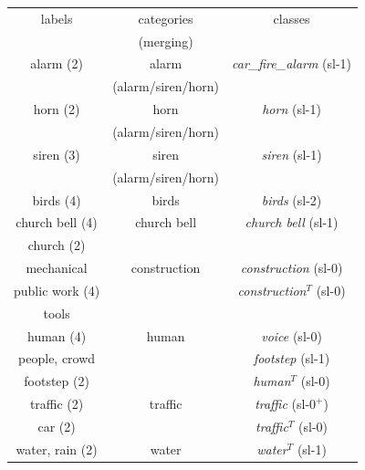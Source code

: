 \begin{table}[t]
\centering
\begin{tabular}{ccc}
labels                & categories         & classes\\
                      & (merging)          &        \\
\hline
alarm (2)             & alarm              &  \textit{car\_fire\_alarm} (sl-1) \\
                      & (alarm/siren/horn) &                                   \\
horn  (2)             & horn               &  \textit{horn} (sl-1)             \\
                      & (alarm/siren/horn) &                                    \\
siren (3)             & siren              &  \textit{siren} (sl-1)            \\
                      & (alarm/siren/horn) &                                    \\
birds (4)             & birds              &  \textit{birds} (sl-2)             \\
\hline
church bell (4)       & church bell        &  \textit{church bell} (sl-1)      \\
church (2)            &                    &                                   \\
\hline
mechanical            & construction       &  \textit{construction} (sl-0)       \\
public work  (4)      &                    &  \textit{construction}$^T$  (sl-0)    \\
tools                 &                    &                                  \\
\hline			                                                             
human (4)             & human              &   \textit{voice} (sl-0)           \\      
people, crowd         &                    &   \textit{footstep} (sl-1)       \\      
footstep (2)          &                    &   \textit{human}$^T$ (sl-0)       \\  
\hline
traffic (2)           & traffic            & \textit{traffic} (sl-$0^{+}$)  \\
car (2)               &                    & \textit{traffic}$^T$ (sl-0)     \\                   
\hline
water, rain (2)       & water              &   \textit{water}$^T$ (sl-1)          \\ 

\end{tabular}
\end{table}
